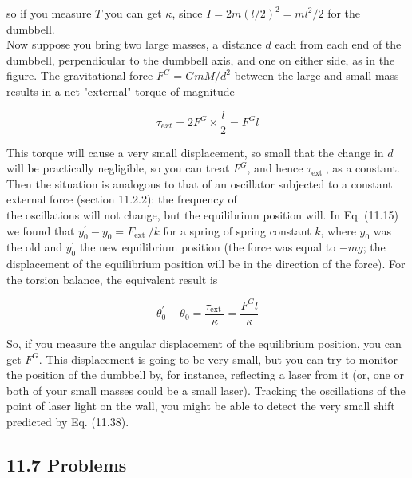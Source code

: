\documentclass[10pt]{article}
\begin{document}
so if you measure $T$ you can get $\kappa$, since $I=2 m(l / 2)^{2}=m l^{2} / 2$ for the dumbbell.\\
Now suppose you bring two large masses, a distance $d$ each from each end of the dumbbell, perpendicular to the dumbbell axis, and one on either side, as in the figure. The gravitational force $F^{G}=G m M / d^{2}$ between the large and small mass results in a net "external" torque of magnitude


\begin{equation*}
\tau_{e x t}=2 F^{G} \times \frac{l}{2}=F^{G} l \tag{11.37}
\end{equation*}


This torque will cause a very small displacement, so small that the change in $d$ will be practically negligible, so you can treat $F^{G}$, and hence $\tau_{\text {ext }}$, as a constant. Then the situation is analogous to that of an oscillator subjected to a constant external force (section 11.2.2): the frequency of\\
the oscillations will not change, but the equilibrium position will. In Eq. (11.15) we found that $y_{0}^{\prime}-y_{0}=F_{\text {ext }} / k$ for a spring of spring constant $k$, where $y_{0}$ was the old and $y_{0}^{\prime}$ the new equilibrium position (the force was equal to $-m g$; the displacement of the equilibrium position will be in the direction of the force). For the torsion balance, the equivalent result is


\begin{equation*}
\theta_{0}^{\prime}-\theta_{0}=\frac{\tau_{\text {ext }}}{\kappa}=\frac{F^{G} l}{\kappa} \tag{11.38}
\end{equation*}


So, if you measure the angular displacement of the equilibrium position, you can get $F^{G}$. This displacement is going to be very small, but you can try to monitor the position of the dumbbell by, for instance, reflecting a laser from it (or, one or both of your small masses could be a small laser). Tracking the oscillations of the point of laser light on the wall, you might be able to detect the very small shift predicted by Eq. (11.38).

\subsection*{11.7 Problems}
\end{document}

